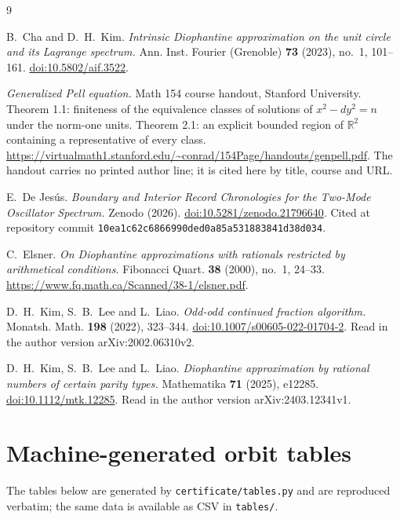 \documentclass[11pt]{article}
\theoremstyle{definition}
\theoremstyle{remark}
\begin{document}
\begin{thebibliography}{9}

 B.~Cha and D.~H.~Kim.
\emph{Intrinsic Diophantine approximation on the unit circle and its Lagrange spectrum.}
Ann. Inst. Fourier (Grenoble) \textbf{73} (2023), no.~1, 101--161.
\href{https://doi.org/10.5802/aif.3522}{doi:10.5802/aif.3522}.

 \emph{Generalized Pell equation.} Math 154 course handout, Stanford
University. Theorem 1.1: finiteness of the equivalence classes of solutions of $x^2-dy^2=n$
under the norm-one units. Theorem 2.1: an explicit bounded region of $\mathbb{R}^2$ containing
a representative of every class.
\url{https://virtualmath1.stanford.edu/~conrad/154Page/handouts/genpell.pdf}.
The handout carries no printed author line; it is cited here by title, course and URL.

 E.~De Jes\'us.
\emph{Boundary and Interior Record Chronologies for the Two-Mode Oscillator Spectrum.}
Zenodo (2026). \href{https://doi.org/10.5281/zenodo.21796640}{doi:10.5281/zenodo.21796640}.
Cited at repository commit \texttt{10ea1c62c6866990ded0a85a531883841d38d034}.

 C.~Elsner.
\emph{On Diophantine approximations with rationals restricted by arithmetical conditions.}
Fibonacci Quart. \textbf{38} (2000), no.~1, 24--33.
\url{https://www.fq.math.ca/Scanned/38-1/elsner.pdf}.

 D.~H.~Kim, S.~B.~Lee and L.~Liao.
\emph{Odd-odd continued fraction algorithm.}
Monatsh. Math. \textbf{198} (2022), 323--344.
\href{https://doi.org/10.1007/s00605-022-01704-2}{doi:10.1007/s00605-022-01704-2}.
Read in the author version arXiv:2002.06310v2.

 D.~H.~Kim, S.~B.~Lee and L.~Liao.
\emph{Diophantine approximation by rational numbers of certain parity types.}
Mathematika \textbf{71} (2025), e12285.
\href{https://doi.org/10.1112/mtk.12285}{doi:10.1112/mtk.12285}.
Read in the author version arXiv:2403.12341v1.

\end{thebibliography}

\appendix
\section{Machine-generated orbit tables}\label{app:tables}

The tables below are generated by \texttt{certificate/tables.py} and are reproduced verbatim;
the same data is available as CSV in \texttt{tables/}.
\end{document}

